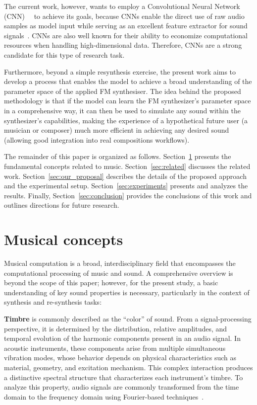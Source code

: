 \documentclass[10pt,conference]{IEEEtran}
\begin{document}
The current work, however, wants to employ a Convolutional Neural Network (CNN)~\cite{LeCun1989}~\cite{alexnet} to achieve its goals, because CNNs enable the direct use of raw audio samples as model input while serving as an excellent feature extractor for sound signals~\cite{kiranyaz2021survey}. CNNs are also well known for their ability to economize computational resources when handling high-dimensional data. Therefore, CNNs are a strong candidate for this type of research task.

Furthermore, beyond a simple resynthesis exercise, the present work aims to develop a process that enables the model to achieve a broad understanding of the parameter space of the applied FM synthesiser. The idea behind the proposed methodology is that if the model can learn the FM synthesizer’s parameter space in a comprehensive way, it can then be used to simulate any sound within the synthesizer’s capabilities, making the experience of a hypothetical future user (a musician or composer) much more efficient in achieving any desired sound (allowing good integration into real compositions workflows).

The remainder of this paper is organized as follows. Section~\ref{sec:fund} presents the fundamental concepts related to music. Section~\ref{sec:related} discusses the related work. Section~\ref{sec:our_proposal} describes the details of the proposed approach and the experimental setup. Section~\ref{sec:experiments} presents and analyzes the results. Finally, Section~\ref{sec:conclusion} provides the conclusions of this work and outlines directions for future research.

\section{Musical concepts} \label{sec:fund}

Musical computation is a broad, interdisciplinary field that encompasses the computational processing of music and sound. A comprehensive overview is beyond the scope of this paper; however, for the present study, a basic understanding of key sound properties is necessary, particularly in the context of synthesis and re-synthesis tasks:

\textbf{Timbre} is commonly described as the ``color'' of sound. From a signal-processing perspective, it is determined by the distribution, relative amplitudes, and temporal evolution of the harmonic components present in an audio signal. In acoustic instruments, these components arise from multiple simultaneous vibration modes, whose behavior depends on physical characteristics such as material, geometry, and excitation mechanism. This complex interaction produces a distinctive spectral structure that characterizes each instrument’s timbre. To analyze this property, audio signals are commonly transformed from the time domain to the frequency domain using Fourier-based techniques~\cite{benson2008music}.
\end{document}
